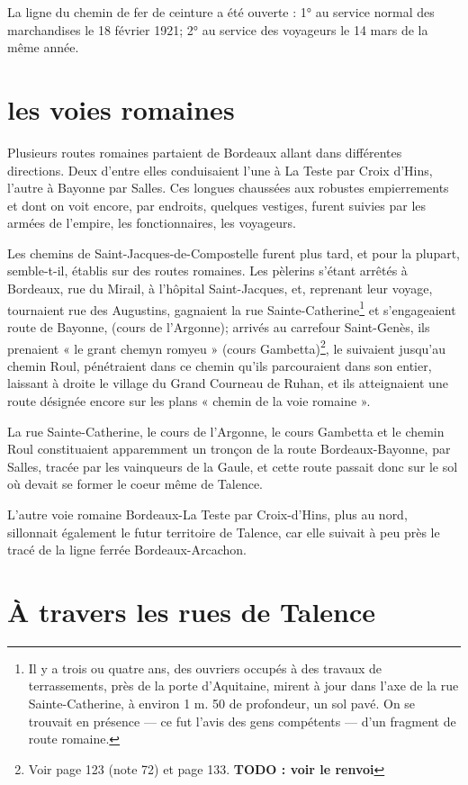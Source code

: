 \documentclass[a4paper,11pt]{book}
\begin{document}
La ligne du chemin de fer de ceinture a été ouverte : 1° au service normal des marchandises le 18 février 1921; 2° au service des voyageurs le 14 mars de la même année.

\section{les voies romaines}

Plusieurs routes romaines partaient de Bordeaux allant dans différentes directions. Deux d'entre elles conduisaient l'une à La Teste par Croix d'Hins, l'autre à Bayonne par Salles. Ces longues chaussées aux robustes empierrements et dont on voit encore, par endroits, quelques vestiges, furent suivies par les armées de l'empire, les fonctionnaires, les voyageurs.

Les chemins de Saint-Jacques-de-Compostelle furent plus tard, et pour la plupart, semble-t-il, établis sur des routes romaines. Les pèlerins s'étant arrêtés à Bordeaux, rue du Mirail, à l'hôpital Saint-Jacques, et, reprenant leur voyage, tournaient rue des Augustins, gagnaient la rue Sainte-Catherine\footnote{Il y a trois ou quatre ans, des ouvriers occupés à des travaux de terrassements, près de la porte d'Aquitaine, mirent à jour dans l'axe de la rue Sainte-Catherine, à environ 1 m. 50 de profondeur, un sol pavé. On se trouvait en présence — ce fut l'avis des gens compétents — d'un fragment de route romaine.} et s'engageaient route de Bayonne, (cours de l'Argonne); arrivés au carrefour Saint-Genès, ils prenaient « le grant chemyn romyeu » (cours Gambetta)\footnote{Voir page 123 (note 72) et page 133. \textbf{TODO : voir le renvoi}}, le suivaient jusqu'au chemin Roul, pénétraient dans ce chemin qu'ils parcouraient dans son entier, laissant à droite le village du Grand Courneau de Ruhan, et ils atteignaient une route désignée encore sur les plans « chemin de la voie romaine ».

La rue Sainte-Catherine, le cours de l'Argonne, le cours Gambetta et le chemin Roul constituaient apparemment un tronçon de la route Bordeaux-Bayonne, par Salles, tracée par les vainqueurs de la Gaule, et cette route passait donc sur le sol où devait se former le coeur même de Talence.

L'autre voie romaine Bordeaux-La Teste par Croix-d'Hins, plus au nord, sillonnait également le futur territoire de Talence, car elle suivait à peu près le tracé de la ligne ferrée Bordeaux-Arcachon.

\section{À travers les rues de Talence}
\end{document}
